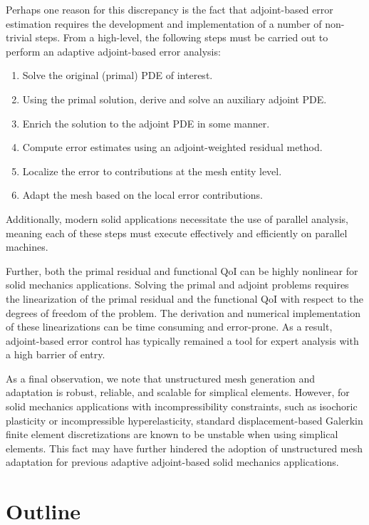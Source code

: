 Perhaps one reason for this discrepancy is the fact that adjoint-based error
estimation requires the development and implementation of a number of
non-trivial steps. From a high-level, the following steps must be carried out
to perform an adaptive adjoint-based error analysis:
%
\begin{enumerate}
\item Solve the original (primal) PDE of interest.
\item Using the primal solution, derive and solve an auxiliary adjoint PDE.
\item Enrich the solution to the adjoint PDE in some manner.
\item Compute error estimates using an adjoint-weighted residual method.
\item Localize the error to contributions at the mesh entity level.
\item Adapt the mesh based on the local error contributions.
\end{enumerate}
%
Additionally, modern solid applications necessitate the use of parallel
analysis, meaning each of these steps must execute effectively and
efficiently on parallel machines.

Further, both the primal residual and functional QoI can be highly nonlinear
for solid mechanics applications. Solving the primal and adjoint problems
requires the linearization of the primal residual and the functional QoI
with respect to the degrees of freedom of the problem. The derivation and
numerical implementation of these linearizations can be time consuming and
error-prone. As a result, adjoint-based error control has typically remained
a tool for expert analysis with a high barrier of entry.

As a final observation, we note that unstructured mesh generation and
adaptation is robust, reliable, and scalable for simplical elements. However,
for solid mechanics applications with incompressibility constraints, such as
isochoric plasticity or incompressible hyperelasticity, standard
displacement-based Galerkin finite element discretizations are known to be
unstable when using simplical elements. This fact may have further hindered
the adoption of unstructured mesh adaptation for previous adaptive
adjoint-based solid mechanics applications.

\section{Outline}

